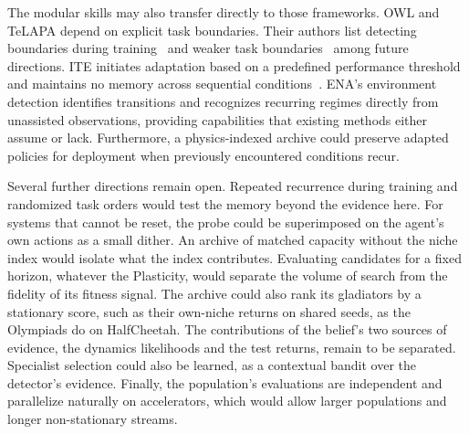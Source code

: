 The modular skills may also transfer directly to those frameworks. OWL and TeLAPA depend on explicit task boundaries. Their authors list detecting boundaries during training~\citep{kessler2022same} and weaker task boundaries~\citep{lillo2026beyond} among future directions. ITE initiates adaptation based on a predefined performance threshold and maintains no memory across sequential conditions~\citep{cully2015robots}. ENA's environment detection identifies transitions and recognizes recurring regimes directly from unassisted observations, providing capabilities that existing methods either assume or lack. Furthermore, a physics-indexed archive could preserve adapted policies for deployment when previously encountered conditions recur.

Several further directions remain open. Repeated recurrence during training and randomized task orders would test the memory beyond the evidence here. For systems that cannot be reset, the probe could be superimposed on the agent's own actions as a small dither. An archive of matched capacity without the niche index would isolate what the index contributes. Evaluating candidates for a fixed horizon, whatever the Plasticity, would separate the volume of search from the fidelity of its fitness signal. The archive could also rank its gladiators by a stationary score, such as their own-niche returns on shared seeds, as the Olympiads do on HalfCheetah. The contributions of the belief's two sources of evidence, the dynamics likelihoods and the test returns, remain to be separated. Specialist selection could also be learned, as a contextual bandit over the detector's evidence. Finally, the population's evaluations are independent and parallelize naturally on accelerators, which would allow larger populations and longer non-stationary streams.
